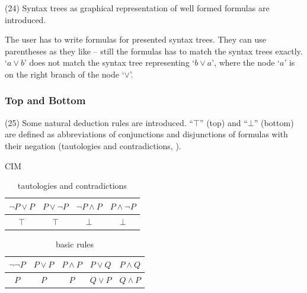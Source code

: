 (24) Syntax trees as graphical representation of well formed formulas are introduced. 

The user has to write formulas for presented syntax trees. They can use parentheses as they like – still the formulas has to match the syntax trees exactly. ‘$a \vee b$’ does not match the syntax tree representing ‘$b \vee a$’, where the node ‘$a$’ is on the right branch of the node ‘$\vee$’.

\subsubsection{Top and Bottom}
\label{tut:25}

(25) Some natural deduction rules are introduced. 
“$\top$” (top) and “$ \bot$” (bottom) are defined
as abbreviations of conjunctions and disjunctions 
of formulas with their negation (tautologies and contradictions, ).

CIM

\begin{table}[htdp]
\begin{center}
\begin{tabular}{c|c|c|c}
$\neg P \vee P$&$P \vee \neg P$  & $\neg P \wedge P$ & $P \wedge \neg P$ \\
\hline
$\top$ & $\top$ & $ \bot$&$ \bot$\\
\end{tabular}
\caption{tautologies and contradictions}
\label{tab:TopBottom}
\end{center}
\end{table}%


%
%
%
\begin{table}[htdp]
\begin{center}
\begin{tabular}{c|c|c|c|c}
$\neg \neg P$ & $P \vee P$ & $P \wedge P$ & $P \vee Q$ & $P \wedge Q$\\
\hline
$P$ & $P$ & $P$ & $Q \vee P$ & $Q \wedge P$\\
\end{tabular}
\caption{basic rules}
\label{tab:BasicRules}
\end{center}
\end{table}
%

